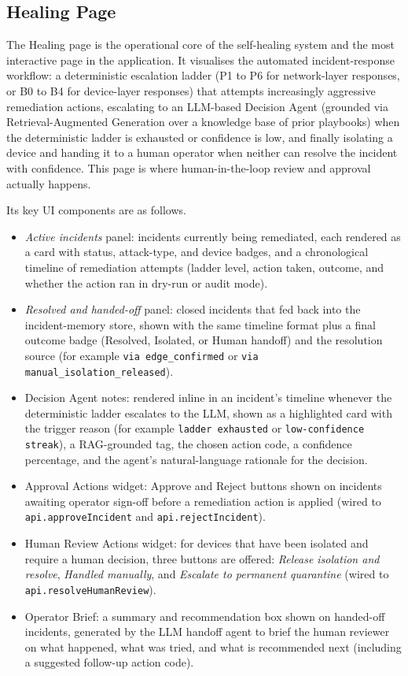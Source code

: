 \subsection{Healing Page}\label{sec:dash_healing}

The Healing page is the operational core of the self-healing system and the most interactive page in the application. It visualises the automated incident-response workflow: a deterministic escalation ladder (P1 to P6 for network-layer responses, or B0 to B4 for device-layer responses) that attempts increasingly aggressive remediation actions, escalating to an LLM-based Decision Agent (grounded via Retrieval-Augmented Generation over a knowledge base of prior playbooks) when the deterministic ladder is exhausted or confidence is low, and finally isolating a device and handing it to a human operator when neither can resolve the incident with confidence. This page is where human-in-the-loop review and approval actually happens.

Its key UI components are as follows.
\begin{itemize}
	\item \textit{Active incidents} panel: incidents currently being remediated, each rendered as a card with status, attack-type, and device badges, and a chronological timeline of remediation attempts (ladder level, action taken, outcome, and whether the action ran in dry-run or audit mode).
	\item \textit{Resolved and handed-off} panel: closed incidents that fed back into the incident-memory store, shown with the same timeline format plus a final outcome badge (Resolved, Isolated, or Human handoff) and the resolution source (for example \texttt{via edge\_confirmed} or \texttt{via manual\_isolation\_released}).
	\item Decision Agent notes: rendered inline in an incident's timeline whenever the deterministic ladder escalates to the LLM, shown as a highlighted card with the trigger reason (for example \texttt{ladder exhausted} or \texttt{low-confidence streak}), a RAG-grounded tag, the chosen action code, a confidence percentage, and the agent's natural-language rationale for the decision.
	\item Approval Actions widget: Approve and Reject buttons shown on incidents awaiting operator sign-off before a remediation action is applied (wired to \texttt{api.approveIncident} and \texttt{api.rejectIncident}).
	\item Human Review Actions widget: for devices that have been isolated and require a human decision, three buttons are offered: \textit{Release isolation and resolve}, \textit{Handled manually}, and \textit{Escalate to permanent quarantine} (wired to \texttt{api.\allowbreak resolveHumanReview}).
	\item Operator Brief: a summary and recommendation box shown on handed-off incidents, generated by the LLM handoff agent to brief the human reviewer on what happened, what was tried, and what is recommended next (including a suggested follow-up action code).
\end{itemize}

